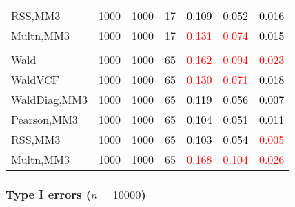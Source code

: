 \documentclass[
]{article}
\begin{document}
\begin{table}[H]
{\begin{tabular}[t]{lrrrrrr}
\hspace{1em}RSS,MM3 & 1000 & 1000 & 17 & \textcolor{black}{0.109} & \textcolor{black}{0.052} & \textcolor{black}{0.016}\\
\hspace{1em}Multn,MM3 & 1000 & 1000 & 17 & \textcolor{red}{0.131} & \textcolor{red}{0.074} & \textcolor{black}{0.015}\\
\addlinespace[0.3em]
\multicolumn{7}{l}{\textbf{3F 15V}}\\
\hspace{1em}Wald & 1000 & 1000 & 65 & \textcolor{red}{0.162} & \textcolor{red}{0.094} & \textcolor{red}{0.023}\\
\hspace{1em}WaldVCF & 1000 & 1000 & 65 & \textcolor{red}{0.130} & \textcolor{red}{0.071} & \textcolor{black}{0.018}\\
\hspace{1em}WaldDiag,MM3 & 1000 & 1000 & 65 & \textcolor{black}{0.119} & \textcolor{black}{0.056} & \textcolor{black}{0.007}\\
\hspace{1em}Pearson,MM3 & 1000 & 1000 & 65 & \textcolor{black}{0.104} & \textcolor{black}{0.051} & \textcolor{black}{0.011}\\
\hspace{1em}RSS,MM3 & 1000 & 1000 & 65 & \textcolor{black}{0.103} & \textcolor{black}{0.054} & \textcolor{red}{0.005}\\
\hspace{1em}Multn,MM3 & 1000 & 1000 & 65 & \textcolor{red}{0.168} & \textcolor{red}{0.104} & \textcolor{red}{0.026}\\
\bottomrule
\end{tabular}}
\endgroup{}
\end{table}

\hypertarget{type-i-errors-n10000-2}{%
\subsubsection{\texorpdfstring{Type I errors
(\(n=10000\))}{Type I errors (n=10000)}}\label{type-i-errors-n10000-2}}
\end{document}
